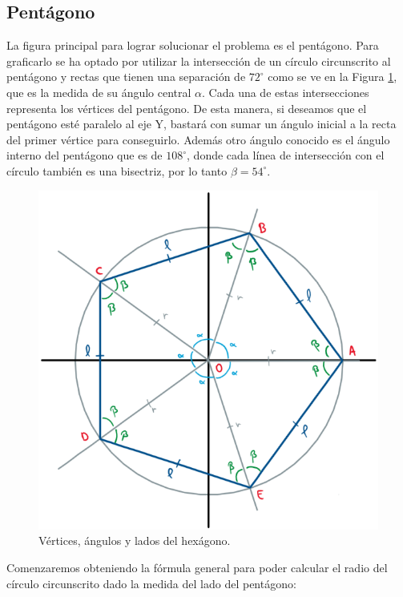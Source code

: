 \documentclass[oneside, a4paper]{article}
\begin{document}
        \subsection{Pentágono}
            La figura principal para lograr solucionar el problema es el pentágono. Para graficarlo se ha optado por utilizar la intersección de un círculo circunscrito al pentágono y rectas que tienen una separación de $72^{\circ}$ como se ve en la Figura \ref{fig:pentagon}, que es la medida de su ángulo central $\alpha$. Cada una de estas intersecciones representa los vértices del pentágono. De esta manera, si deseamos que el pentágono esté paralelo al eje Y, bastará con sumar un ángulo inicial a la recta del primer vértice para conseguirlo. Además otro ángulo conocido es el ángulo interno del pentágono que es de $108^{\circ}$, donde cada línea de intersección con el círculo también es una bisectriz, por lo tanto $\beta = 54^{\circ}$.

            \begin{figure}[H]
                \centering
                \includegraphics[scale=0.5]{pentagon.png}
                \caption{Vértices, ángulos y lados del hexágono.}
                \label{fig:pentagon}
            \end{figure}

            Comenzaremos obteniendo la fórmula general para poder calcular el radio del círculo circunscrito dado la medida del lado del pentágono:
            
\end{document}
